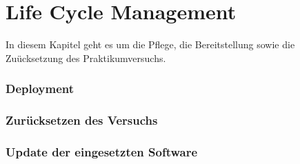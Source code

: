 \chapter{Life Cycle Management}

In diesem Kapitel geht es um die Pflege, die Bereitstellung sowie die Zuücksetzung des Praktikumversuchs.

\subsection{Deployment}

\subsection{Zurücksetzen des Versuchs}

\subsection{Update der eingesetzten Software}




